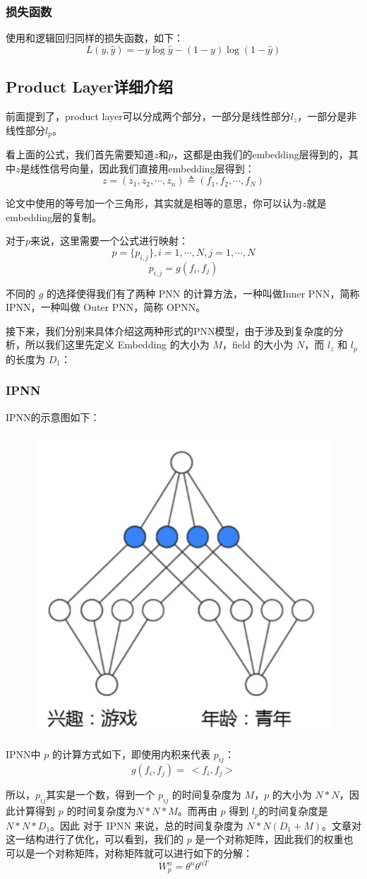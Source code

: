 \documentclass[12pt]{article}
\begin{document}
\subsubsection{损失函数}
使用和逻辑回归同样的损失函数，如下：
$$
L(y, \hat{y}) = -y \log \hat{y} - (1-y)\log (1-\hat{y})
$$

\subsection{Product Layer详细介绍}
前面提到了，product layer可以分成两个部分，一部分是线性部分$l_z$，一部分是非线性部分$l_p$。

看上面的公式，我们首先需要知道$z$和$p$，这都是由我们的embedding层得到的，其中$z$是线性信号向量，因此我们直接用embedding层得到：
$$
z = (z_1, z_2, \cdots, z_n) \triangleq (f_1, f_2, \cdots, f_N)
$$

论文中使用的等号加一个三角形，其实就是相等的意思，你可以认为$z$就是embedding层的复制。

对于$p$来说，这里需要一个公式进行映射：
$$
p = \{p_{i,j}\}, i = 1, \cdots, N, j = 1, \cdots, N
$$
$$
p_{i,j} = g(f_i, f_j)
$$

不同的 $g$ 的选择使得我们有了两种 PNN 的计算方法，一种叫做Inner PNN，简称 IPNN，一种叫做 Outer PNN，简称 OPNN。

接下来，我们分别来具体介绍这两种形式的PNN模型，由于涉及到复杂度的分析，所以我们这里先定义 Embedding 的大小为 $M$，field 的大小为 $N$，而 $l_z$ 和 $l_p$ 的长度为 $D_1$：

\subsubsection{IPNN}
IPNN的示意图如下：
\begin{figure}[H]
    \centering
    \includegraphics[width=.3\textwidth]{fig/DCN_IPNN_Example.png}
\end{figure}

IPNN中 $p$ 的计算方式如下，即使用内积来代表 $p_{ij}$：
$$
g(f_i, f_j) = \ < f_i, f_j >
$$

所以，$p_{ij}$其实是一个数，得到一个 $p_{ij}$ 的时间复杂度为 $M$，$p$ 的大小为 $N*N$，因此计算得到 $p$ 的时间复杂度为$N*N*M$。而再由 $p$ 得到 $l_p$的时间复杂度是 $N*N*D_1$。因此 对于 IPNN 来说，总的时间复杂度为 $N*N(D_1+M)$。文章对这一结构进行了优化，可以看到，我们的 $p$ 是一个对称矩阵，因此我们的权重也可以是一个对称矩阵，对称矩阵就可以进行如下的分解：
$$
W_p^n = \theta^n \theta^{nT}
$$
\end{document}
